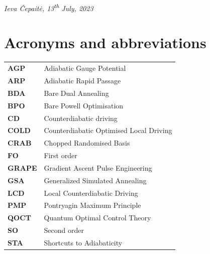 \documentclass[a4paper,oneside,11pt]{book}
\begin{document}
\begin{flushright}
\emph{Ieva \v{C}epait\.{e}, 13\textsuperscript{th} July, 2023}
\end{flushright}

\chapter{Acronyms and abbreviations}

\begin{table}[h]
      \begin{tabular}{p{3cm}  p{8cm}}

        \textbf{AGP}\label{acr:AGP} & Adiabatic Gauge Potential \\ [7pt]
        \textbf{ARP}\label{acr:ARP} & Adiabatic Rapid Passage \\ [7pt]
        \textbf{BDA}\label{acr:BDA} & Bare Dual Annealing \\[7pt]
        \textbf{BPO}\label{acr:BPO} & Bare Powell Optimisation \\[7pt]
        \textbf{CD}\label{acr:CD} & Counterdiabatic driving \\[7pt]
        \textbf{COLD}\label{acr:COLD} & Counterdiabatic Optimised Local Driving \\[7pt]
        \textbf{CRAB}\label{acr:CRAB} & Chopped Randomised Basis \\ [7pt]
        \textbf{FO}\label{acr:FO} & First order \\ [7pt]
        \textbf{GRAPE}\label{acr:GRAPE} & Gradient Ascent Pulse Engineering \\ [7pt]
        \textbf{GSA}\label{acr:GSA} & Generalized Simulated Annealing \\ [7pt]
        \textbf{LCD}\label{acr:LCD} & Local Counterdiabatic Driving \\[7pt]
        \textbf{PMP}\label{acr:PMP} & Pontryagin Maximum Principle \\[7pt]
        \textbf{QOCT}\label{acr:QOCT} & Quantum Optimal Control Theory \\[7pt]
        \textbf{SO}\label{acr:SO} & Second order \\ [7pt]
        \textbf{STA}\label{acr:STA} & Shortcuts to Adiabaticity \\[7pt]

    \end{tabular}

\end{table}\label{table}

\listoffigures
\end{document}

